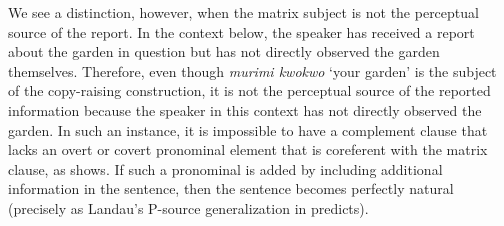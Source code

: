 \documentclass[output=paper,colorlinks,citecolor=brown
]{langscibook}
\begin{document}








\z 

We see a distinction, however, when the matrix subject is not the perceptual source of the report. In the context below, the speaker has received a report about the garden in question but has not directly observed the garden themselves. Therefore, even though \textit{murimi kwokwo} `your garden' is the subject of the copy-raising construction, it is not the perceptual source of the reported information because the speaker in this context has not directly observed the garden. In such an instance, it is impossible to have a complement clause that lacks an overt or covert pronominal element that is coreferent with the matrix clause, as  shows. If such a pronominal is added by including additional information in the sentence, then the sentence becomes perfectly natural (precisely as Landau's  \citeyear{Landau:2011:CopyRaising} P-source generalization in  predicts).
\end{document}
